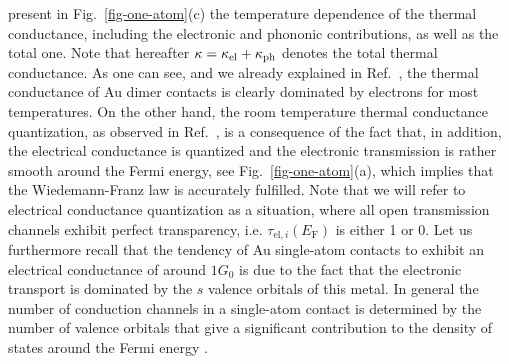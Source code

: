 \documentclass[aps,amsmath,amssymb,twocolumn,showpacs]{revtex4-1}
\begin{document}
present in Fig.~\ref{fig-one-atom}(c) the temperature dependence of the
thermal conductance, including the electronic and phononic contributions, as
well as the total one. Note that hereafter $\kappa=\kappa_{\rm el} + 
\kappa_{\rm ph}$ denotes the total thermal conductance. As one can see,
and we already explained in Ref.~, the thermal conductance
of Au dimer contacts is clearly dominated by electrons for most
temperatures. On the other hand, the room temperature thermal conductance
quantization, as observed in Ref.~, is a consequence of
the fact that, in addition, the electrical conductance is quantized and the
electronic transmission is rather smooth around the Fermi energy, see
Fig.~\ref{fig-one-atom}(a), which implies that the Wiedemann-Franz law is
accurately fulfilled. Note that we will refer to electrical conductance
quantization as a situation, where all open transmission channels exhibit
perfect transparency, i.e. $\tau_{\text{el},i}(E_{\text{F}})$ is either 1 or
0. Let us furthermore recall that the tendency of Au single-atom contacts to
exhibit an electrical conductance of around $1G_0$ is due to the fact that the
electronic transport is dominated by the $s$ valence orbitals of this
metal. In general the number of conduction channels in a single-atom contact
is determined by the number of valence orbitals that give a significant
contribution to the density of states around the Fermi energy
\cite{Cuevas1998a,Scheer1998}.
\end{document}

